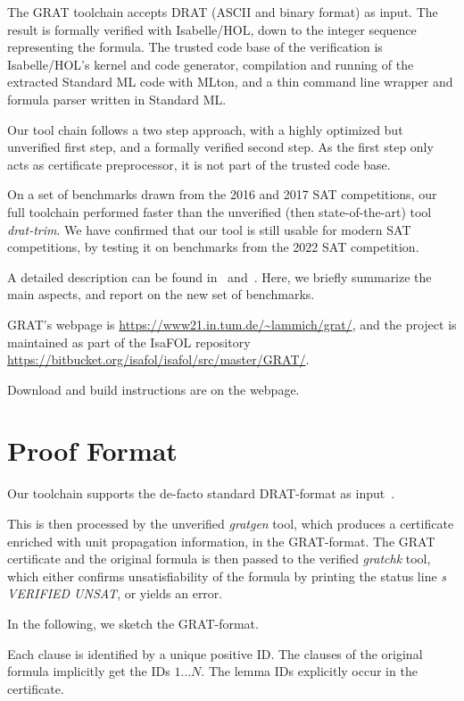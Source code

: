 \documentclass[conference]{IEEEtran}
\begin{document}
The GRAT toolchain accepts DRAT (ASCII and binary format) as input.
The result is formally verified with Isabelle/HOL, down to the integer sequence representing the formula.
The trusted code base of the verification is Isabelle/HOL's kernel and code generator,
compilation and running of the extracted Standard ML code with MLton, and a thin command line wrapper and formula parser
written in Standard ML.

Our tool chain follows a two step approach, with a highly optimized but unverified first step,
and a formally verified second step. As the first step only acts as certificate preprocessor,
it is not part of the trusted code base.

On a set of benchmarks drawn from the 2016 and 2017 SAT competitions, our full toolchain performed faster
than the unverified (then state-of-the-art) tool {\sl drat-trim}.
We have confirmed that our tool is still usable for modern SAT competitions, by testing it on benchmarks from the 2022 SAT competition.

A detailed description can be found in~\cite{La17_CADE,La17_SAT} and~\cite{La20}.
Here, we briefly summarize the main aspects, and report on the new set of benchmarks.

GRAT's webpage is \url{https://www21.in.tum.de/~lammich/grat/}, and the project is maintained as part of the IsaFOL repository \url{https://bitbucket.org/isafol/isafol/src/master/GRAT/}.

Download and build instructions are on the webpage.


\section{Proof Format}
Our toolchain supports the de-facto standard DRAT-format as input~\cite{WHH14}.

This is then processed by the unverified {\sl gratgen} tool, which produces a certificate enriched with unit
propagation information, in the GRAT-format. The GRAT certificate and the original formula
is then passed to the verified {\sl gratchk} tool, which either confirms unsatisfiability of the formula by printing
the status line {\sl s VERIFIED UNSAT}, or yields an error.

In the following, we sketch the GRAT-format.

Each clause is identified by a unique positive ID.
The clauses of the original formula implicitly get the IDs $1\ldots N$. The lemma IDs explicitly occur in the certificate.
\end{document}
